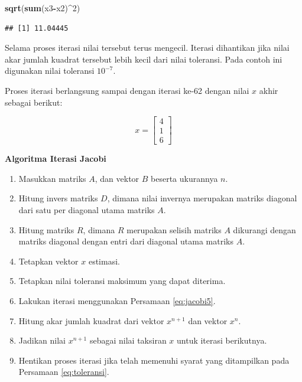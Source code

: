 \documentclass[]{book}
\newenvironment{Shaded}{\begin{snugshade}}{\end{snugshade}}
\newcommand{\DecValTok}[1]{\textcolor[rgb]{0.00,0.00,0.81}{#1}}
\newcommand{\KeywordTok}[1]{\textcolor[rgb]{0.13,0.29,0.53}{\textbf{#1}}}
\newcommand{\NormalTok}[1]{#1}
\newcommand{\OperatorTok}[1]{\textcolor[rgb]{0.81,0.36,0.00}{\textbf{#1}}}
\providecommand{\tightlist}{%
  \setlength{\itemsep}{0pt}\setlength{\parskip}{0pt}}
\theoremstyle{definition}
\theoremstyle{definition}
\theoremstyle{definition}
\theoremstyle{remark}
\begin{document}
\begin{Shaded}
\begin{Highlighting}[]
\KeywordTok{sqrt}\NormalTok{(}\KeywordTok{sum}\NormalTok{(x3}\OperatorTok{-}\NormalTok{x2)}\OperatorTok{^}\DecValTok{2}\NormalTok{)}
\end{Highlighting}
\end{Shaded}

\begin{verbatim}
## [1] 11.04445
\end{verbatim}

Selama proses iterasi nilai tersebut terus mengecil. Iterasi dihantikan jika nilai akar jumlah kuadrat tersebut lebih kecil dari nilai toleransi. Pada contoh ini digunakan nilai toleransi \(10^{-7}\).

Proses iterasi berlangsung sampai dengan iterasi ke-62 dengan nilai \(x\) akhir sebagai berikut:

\[
x = \begin{bmatrix}
     4     \\[0.3em]
     1     \\[0.3em]
     6
\end{bmatrix}
\]

\textbf{Algoritma Iterasi Jacobi}

\begin{enumerate}
\def\labelenumi{\arabic{enumi}.}
\tightlist
\item
  Masukkan matriks \(A\), dan vektor \(B\) beserta ukurannya \(n\).
\item
  Hitung invers matriks \(D\), dimana nilai invernya merupakan matriks diagonal dari satu per diagonal utama matriks \(A\).
\item
  Hitung matriks \(R\), dimana \(R\) merupakan selisih matriks \(A\) dikurangi dengan matriks diagonal dengan entri dari diagonal utama matriks \(A\).
\item
  Tetapkan vektor \(x\) estimasi.
\item
  Tetapkan nilai toleransi maksimum yang dapat diterima.
\item
  Lakukan iterasi menggunakan Persamaan \eqref{eq:jacobi5}.
\item
  Hitung akar jumlah kuadrat dari vektor \(x^{n+1}\) dan vektor \(x^n\).
\item
  Jadikan nilai \(x^{n+1}\) sebagai nilai taksiran \(x\) untuk iterasi berikutnya.
\item
  Hentikan proses iterasi jika telah memenuhi syarat yang ditampilkan pada Persamaan \eqref{eq:toleransi}.
\end{enumerate}
\end{document}
